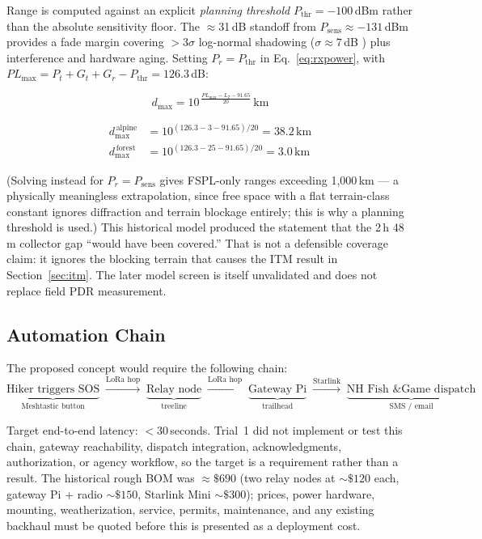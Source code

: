 \documentclass[11pt,letterpaper]{article}
\begin{document}
Range is computed against an explicit \emph{planning threshold}
$P_{\mathrm{thr}} = -100$\,dBm rather than the absolute sensitivity floor. The
$\approx$31\,dB standoff from $P_{\mathrm{sens}} \approx -131$\,dBm provides a fade
margin covering $>3\sigma$ log-normal shadowing ($\sigma \approx 7$\,dB
\cite{bianco2021}) plus interference and hardware aging. Setting
$P_r = P_{\mathrm{thr}}$ in Eq.~\eqref{eq:rxpower}, with
$PL_{\max} = P_t + G_t + G_r - P_{\mathrm{thr}} = 126.3$\,dB:

\begin{equation}
  d_{\max} = 10^{\,\frac{PL_{\max} - L_T - 91.65}{20}}\,\mathrm{km}
  \label{eq:dmax}
\end{equation}

\begin{align*}
  d_{\max}^{\,\text{alpine}} &= 10^{(126.3 - 3 - 91.65)/20} = 38.2\,\mathrm{km} \\
  d_{\max}^{\,\text{forest}} &= 10^{(126.3 - 25 - 91.65)/20} = 3.0\,\mathrm{km}
\end{align*}

(Solving instead for $P_r = P_{\mathrm{sens}}$ gives FSPL-only ranges exceeding
1{,}000\,km --- a physically meaningless extrapolation, since free space with a flat
terrain-class constant ignores diffraction and terrain blockage entirely; this is why
a planning threshold is used.) This historical model produced the statement that the
2\,h 48\,m collector gap ``would have been covered.'' That is not a defensible coverage
claim: it ignores the blocking terrain that causes the ITM result in
Section~\ref{sec:itm}. The later model screen is itself unvalidated and does not replace
field PDR measurement.

\subsection{Automation Chain}

The proposed concept would require the following chain:
\[
  \underbrace{\text{Hiker triggers SOS}}_{\text{Meshtastic button}}
  \;\xrightarrow{\text{LoRa hop}}\;
  \underbrace{\text{Relay node}}_{\text{treeline}}
  \;\xrightarrow{\text{LoRa hop}}\;
  \underbrace{\text{Gateway Pi}}_{\text{trailhead}}
  \;\xrightarrow{\text{Starlink}}\;
  \underbrace{\text{NH Fish \& Game dispatch}}_{\text{SMS / email}}
\]

Target end-to-end latency: $<$30\,seconds. Trial~1 did not implement or test this chain,
gateway reachability, dispatch integration, acknowledgments, authorization, or agency
workflow, so the target is a requirement rather than a result. The historical rough BOM
was $\approx\$690$ (two relay nodes at $\sim\$120$ each, gateway Pi + radio $\sim\$150$,
Starlink Mini $\sim\$300$); prices, power hardware, mounting, weatherization, service,
permits, maintenance, and any existing backhaul must be quoted before this is presented
as a deployment cost.
\end{document}

